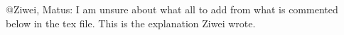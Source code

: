 \alert{@Ziwei, Matus: I am unsure about what all to add from what is commented below in the tex file. This is the explanation Ziwei wrote.}
\begin{comment}
\paragraph{Online model.}
In the online model, consumers with unknown valuations come sequentially in one round, whose eventual aggregate demand gives the cost. Price change is allowed betwenn arrivals of different consumers. Here the difficulty lies on both ignorance of valuations and the natural restriction of the online setting. (It can be observed that in Table \ref{comparison} query complexity for Algorithm \ref{onlineSWMaxAlg} is missing, since in the online model the query complexity is always $m$.)

Recall that in the offline setting, we basically minimize a convex function $f(\mathbf{p})=c^*(\mathbf{p})-\sum_{i=1}^{m}v_{i*}(\mathbf{p})$ over the dual space. In the online setting, it is natural to replace the previous convex optimization problem with an online convex optimization (OCO) problem over the dual space. Formally, at step $i$ (the arrival of consumer $i$), we decide prices $\mathbf{p}_i$, after which a convex $f_i$ is revealed and a loss of $f_i(\mathbf{p}_i)$ is suffered. We are interested in minimizing the \emph{regret}
\[
    \sum_{i=1}^{m}f_i(\mathbf{p}_i)-\min_{\mathbf{p}\ge \mathbf{0}}\sum_{i=1}^{m}f_i(\mathbf{p}).
\]
Inspired by the offline setting, it is natural to try the following algorithm:
\begin{enumerate}
    \item Let $\mathcal{A}$ be some gradient-based OCO algorithm, and $\mathbf{p}_1$ be the initial prices chosen by $\mathcal{A}$.

    \item For $i=1,\ldots,m$:
    \begin{enumerate}
        \item Post $\mathbf{p}_i$.
        \item Give $f_i(\mathbf{p})=\frac{1}{m}c^*(\mathbf{p})-\tilde{v}_{i*}(\mathbf{p})$ to $\mathcal{A}$.
        \item Receive updated $\mathbf{p}_{i+1}$ from $\mathcal{A}$.
    \end{enumerate}
\end{enumerate}
(The notation $\tilde{v}_i$, and $\tilde{\mathbf{x}}_i$ in the following, is for the sake of consistency; the reason of using it will become clear as soon as the formal model is introduced.) Note that as long as the OCO algorithm we use is gradient based, the ignorance of $v_{i*}$ will not affect us, since its gradient is given by the revealed preference.


\end{comment}
